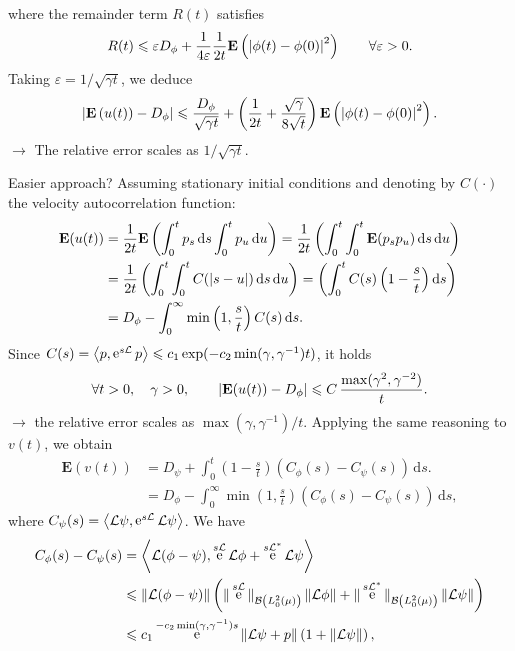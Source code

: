 \documentclass[11pt,a4paper]{article}
\DeclareMathOperator{\e}{e}
\newcommand{\expect}[0]{\mathbf{E}}
\renewcommand{\d}{\mathrm d}
\theoremstyle{plain}
\numberwithin{equation}{section}
\renewcommand{\leq}{\leqslant}
\begin{document}
where the remainder term $R(t)$ satisfies
\begin{align*}
    R(t) \leq \varepsilon D_{\phi} + \frac{1}{4 \varepsilon} \frac{1}{2t} \expect \left( \abs{\phi(t) - \phi(0)}^2\right) \qquad \forall \varepsilon > 0.
\end{align*}
Taking $\varepsilon = 1/\sqrt{\gamma t}$, we deduce
\[
    \abs{\expect \left( u(t) \right) - D_{\phi}}
    \leq \frac{D_{\phi}}{\sqrt{\gamma t}} + \left( \frac{1}{2t} + \frac{\sqrt{\gamma}}{8\sqrt{t}} \right)\expect \left( \abs{\phi(t) - \phi(0)}^2\right).
\]
$\rightarrow$ The relative error scales as \( 1 / \sqrt{\gamma t}\).


\newpage
Easier approach? Assuming stationary initial conditions and denoting by $C(\cdot)$ the velocity autocorrelation function:
\begin{align*}
    \expect (u(t))
    &= \frac{1}{2t} \expect \left( \int_{0}^{t} p_s \, \d s \int_{0}^{t} p_u \, \d u \right)
    = \frac{1}{2t} \left( \int_{0}^{t} \int_{0}^{t} \expect (p_s p_u) \, \d s \, \d u \right) \\
    &= \frac{1}{2t} \left( \int_{0}^{t} \int_{0}^{t} C(\abs{s - u}) \, \d s \, \d u \right)
    = \left( \int_{0}^{t} C(s) \left(1 - \frac{s}{t}\right) \d s \right) \\
    &= D_{\phi} - \int_{0}^{\infty} \min\left(1, \frac{s}{t}\right) C(s) \, \d s.
\end{align*}
Since $C(s) = \ip{p}{\e^{s \mathcal L} p} \leq c_1 \exp( - c_2 \min(\gamma, \gamma^{-1}) t)$, it holds
\[
    \forall t > 0, \quad \gamma > 0, \qquad
    \abs{\expect(u(t)) - D_{\phi}} \leq  C \, \frac{\max(\gamma^2, \gamma^{-2})}{t}.
\]
$\rightarrow$ the relative error scales as $\max(\gamma, \gamma^{-1}) / t$.
Applying the same reasoning to $v(t)$, we obtain
\begin{align*}
    \expect (v(t))
    &= D_{\psi} + \int_{0}^{t} \left(1 - \frac{s}{t}\right) \left( C_{\phi}(s) - C_{\psi}(s) \right) \, \d s. \\
    &= D_{\phi} - \int_{0}^{\infty} \min\left(1, \frac{s}{t}\right) \left( C_{\phi}(s) - C_{\psi}(s) \right) \, \d s,
\end{align*}
where $C_{\psi}(s) = \ip{\mathcal L \psi}{\e^{s \mathcal L} \mathcal L \psi}$.
We have
\begin{align*}
    C_{\phi}(s) - C_{\psi}(s)
    &= \ip{\mathcal L (\phi - \psi)}{\e^{s \mathcal L} \mathcal L \phi + \e^{s \mathcal L^*} \mathcal  L\psi} \\
    &\leq \norm{\mathcal L(\phi - \psi)}
    \left( \norm*{\e^{s \mathcal L}}[\mathcal B\left(L^2_0(\mu) \right)] \norm{\mathcal L \phi} + \norm*{\e^{s \mathcal L^*}}[\mathcal B\left(L^2_0(\mu) \right)] \norm{\mathcal L \psi} \right) \\
    &\leq c_1 \e^{-c_2 \min(\gamma, \gamma^{-1}) s} \norm{\mathcal L\psi + p}  \left(1 + \norm{\mathcal L \psi} \right),
\end{align*}
\end{document}
